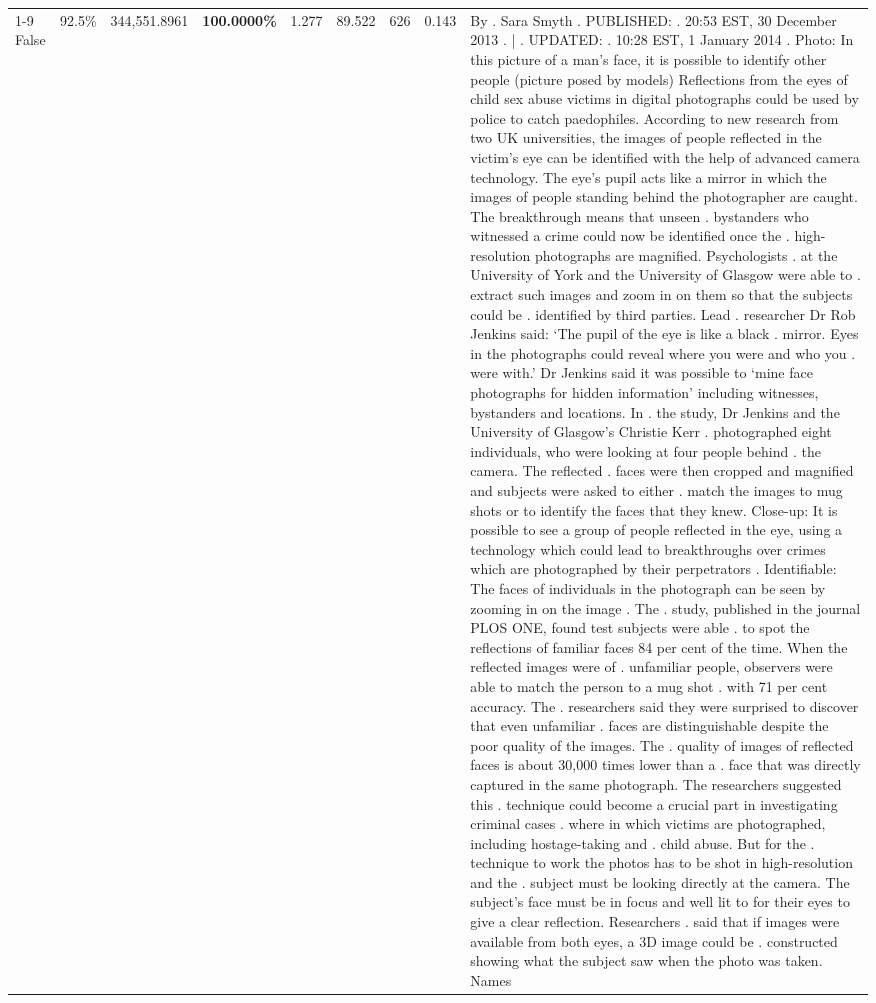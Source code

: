 \begin{table}[H]
\begin{tabular}{lllrlllll}
\cline{1-9} \cline{2-9}
False & 92.5\% & 344,551.8961 & \bfseries \color{red} 100.0000\% & 1.277 & 89.522 & 626 & 0.143 & By . Sara Smyth . PUBLISHED: . 20:53 EST, 30 December 2013 . | . UPDATED: . 10:28 EST, 1 January 2014 . Photo: In this picture of a man's face, it is possible to identify other people (picture posed by models) Reflections from the eyes of child sex abuse victims in digital photographs could be used by police to catch paedophiles. According to new research from two UK universities, the images of people reflected in the victim's eye can be identified with the help of advanced camera technology. The eye's pupil acts like a mirror in which the images of people standing behind the photographer are caught. The breakthrough means that unseen . bystanders who witnessed a crime could now be identified once the . high-resolution photographs are magnified. Psychologists . at the University of York and the University of Glasgow were able to . extract such images and zoom in on them so that the subjects could be . identified by third parties. Lead . researcher Dr Rob Jenkins said: ‘The pupil of the eye is like a black . mirror. Eyes in the photographs could reveal where you were and who you . were with.' Dr Jenkins said it was possible to ‘mine face photographs for hidden information' including witnesses, bystanders and locations. In . the study, Dr Jenkins and the University of Glasgow's Christie Kerr . photographed eight individuals, who were looking at four people behind . the camera. The reflected . faces were then cropped and magnified and subjects were asked to either . match the images to mug shots or to identify the faces that they knew. Close-up: It is possible to see a group of people reflected in the eye, using a technology which could lead to breakthroughs over crimes which are photographed by their perpetrators . Identifiable: The faces of individuals in the photograph can be seen by zooming in on the image . The . study, published in the journal PLOS ONE, found test subjects were able . to spot the reflections of familiar faces 84 per cent of the time. When the reflected images were of . unfamiliar people, observers were able to match the person to a mug shot . with 71 per cent accuracy. The . researchers said they were surprised to discover that even unfamiliar . faces are distinguishable despite the poor quality of the images. The . quality of images of reflected faces is about 30,000 times lower than a . face that was directly captured in the same photograph. The researchers suggested this . technique could become a crucial part in investigating criminal cases . where in which victims are photographed, including hostage-taking and . child abuse. But for the . technique to work the photos has to be shot in high-resolution and the . subject must be looking directly at the camera. The subject's face must be in focus and well lit to for their eyes to give a clear reflection. Researchers . said that if images were available from both eyes, a 3D image could be . constructed showing what the subject saw when the photo was taken. Names \\

\end{tabular}
\end{table}
